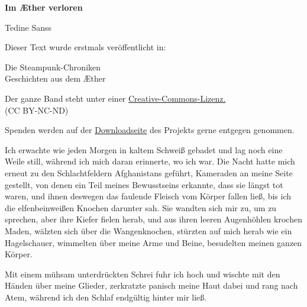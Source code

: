 \usepackage[ngerman]{babel}
\usepackage[T1]{fontenc}



\newcommand\bigpar\medskip



\raggedbottom
\begin{center}
\textbf{\huge\textsf{Im Æther verloren}}

\medskip
Tedine Sanss

\end{center}

\bigskip

\begin{flushleft}
Dieser Text wurde erstmals veröffentlicht in:
\begin{center}
Die Steampunk-Chroniken\\
Geschichten aus dem Æther
\end{center}

\bigskip

Der ganze Band steht unter einer 
\href{http://creativecommons.org/licenses/by-nc-nd/2.0/de/}{Creative-Commons-Lizenz.} \\ 
(CC BY-NC-ND)

\bigskip

Spenden werden auf der 
\href{http://steampunk-chroniken.de/download}{Downloadseite}
des Projekts gerne entgegen genommen. 
\end{flushleft}

\newpage

Ich erwachte wie jeden Morgen in kaltem Schweiß gebadet und lag
noch eine Weile still, während ich mich daran erinnerte, wo ich
war. Die Nacht hatte mich erneut zu den Schlachtfeldern
Afghanistans geführt, Kameraden an meine Seite gestellt, von denen
ein Teil meines Bewusstseins erkannte, dass sie längst tot waren,
und ihnen deswegen das faulende Fleisch vom Körper fallen ließ, bis
ich die elfenbeinweißen Knochen darunter sah. Sie wandten sich mir
zu, um zu sprechen, aber ihre Kiefer fielen herab, und aus ihren
leeren Augenhöhlen krochen Maden, wälzten sich über die
Wangenknochen, stürzten auf mich herab wie ein Hagelschauer,
wimmelten über meine Arme und Beine, besudelten meinen ganzen
Körper.

\bigpar

Mit einem mühsam unterdrückten Schrei fuhr ich hoch und wischte mit
den Händen über meine Glieder, zerkratzte panisch meine Haut dabei
und rang nach Atem, während ich den Schlaf endgültig hinter mir
ließ.

